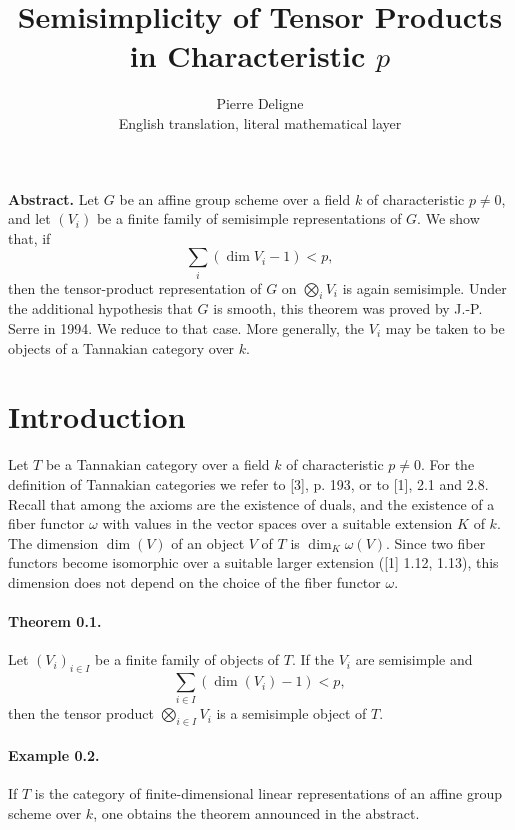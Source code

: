 \documentclass[11pt]{article}
\theoremstyle{plain}
\theoremstyle{definition}
\begin{document}
\title{Semisimplicity of Tensor Products in Characteristic \texorpdfstring{$p$}{p}}
\author{Pierre Deligne\\English translation, literal mathematical layer}
\date{}
\maketitle

\noindent\textbf{Abstract.} Let $G$ be an affine group scheme over a field $k$ of characteristic $p\ne0$, and let $(V_i)$ be a finite family of semisimple representations of $G$. We show that, if
\[
   \sum_i (\dim V_i-1)<p,
\]
then the tensor-product representation of $G$ on $\bigotimes_i V_i$ is again semisimple. Under the additional hypothesis that $G$ is smooth, this theorem was proved by J.-P. Serre in 1994. We reduce to that case. More generally, the $V_i$ may be taken to be objects of a Tannakian category over $k$.

\tableofcontents

\section{Introduction}
Let $T$ be a Tannakian category over a field $k$ of characteristic $p\ne0$. For the definition of Tannakian categories we refer to [3], p. 193, or to [1], 2.1 and 2.8. Recall that among the axioms are the existence of duals, and the existence of a fiber functor $\omega$ with values in the vector spaces over a suitable extension $K$ of $k$. The dimension $\dim(V)$ of an object $V$ of $T$ is $\dim_K\omega(V)$. Since two fiber functors become isomorphic over a suitable larger extension ([1] 1.12, 1.13), this dimension does not depend on the choice of the fiber functor $\omega$.

\paragraph{Theorem 0.1.} Let $(V_i)_{i\in I}$ be a finite family of objects of $T$. If the $V_i$ are semisimple and
\[
   \sum_{i\in I}(\dim(V_i)-1)<p,
\]
then the tensor product $\bigotimes_{i\in I}V_i$ is a semisimple object of $T$.

\paragraph{Example 0.2.} If $T$ is the category of finite-dimensional linear representations of an affine group scheme over $k$, one obtains the theorem announced in the abstract.
\end{document}
